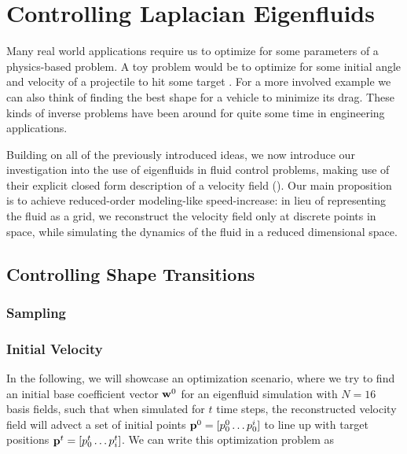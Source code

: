 \chapter{Controlling Laplacian Eigenfluids}
Many real world applications require us to optimize for some parameters of
a physics-based problem. A toy problem would be to optimize for some initial
angle and velocity of a projectile to hit some target . For a more involved example we can also think of finding
the best shape for a vehicle to minimize its drag.\cite{MinDrag} These kinds of
inverse problems have been around for quite some time in engineering
applications.

Building on all of the previously introduced ideas, we now introduce our
investigation into the use of eigenfluids in fluid control problems, making use
of their explicit closed form description of a velocity field (). Our main proposition is to achieve reduced-order modeling-like
speed-increase: in lieu of representing the fluid as a grid, we reconstruct the
velocity field only at discrete points in space, while simulating the dynamics
of the fluid in a reduced dimensional space.


\section{Controlling Shape Transitions}
\label{section:controlling-shape-transitions}
\subsection*{Sampling}
\subsection{Initial Velocity}

In the following, we will showcase an optimization scenario, where we try to
find an initial base coefficient vector $\vb{w}^{0}$ for an eigenfluid
simulation with $N=16$ basis fields, such that when simulated for $t$ time
steps, the reconstructed velocity field will advect a set of initial points
$\vb{p}^0 = [p^0_0\dots p^i_0]$ to line up with target positions 
$\vb{p}^{t} = [p^t_0\dots p^t_i]$. We can write this optimization problem as 

